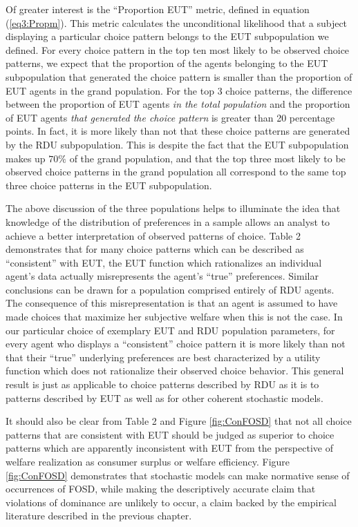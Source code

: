 \documentclass[../main.tex]{subfiles}
\begin{document}
Of greater interest is the \enquote{Proportion EUT} metric, defined in equation (\ref{eq3:Propm}).
This metric calculates the unconditional likelihood that a subject displaying a particular choice pattern belongs to the EUT subpopulation we defined.
For every choice pattern in the top ten most likely to be observed choice patterns, we expect that the proportion of the agents belonging to the EUT subpopulation that generated the choice pattern is smaller than the proportion of EUT agents in the grand population.
For the top 3 choice patterns, the difference between the proportion of EUT agents \textit{in the total population} and the proportion of EUT agents \textit{that generated the choice pattern} is greater than 20 percentage points.
In fact, it is more likely than not that these choice patterns are generated by the RDU subpopulation.
This is despite the fact that the EUT subpopulation makes up $70\%$ of the grand population, and that the top three most likely to be observed choice patterns in the grand population all correspond to the same top three choice patterns in the EUT subpopulation.


The above discussion of the three populations helps to illuminate the idea that knowledge of the distribution of preferences in a sample allows an analyst to achieve a better interpretation of observed patterns of choice.
Table 2 demonstrates that for many choice patterns which can be described as \enquote{consistent} with EUT, the EUT function which rationalizes an individual agent's data actually misrepresents the agent's \enquote{true} preferences.
Similar conclusions can be drawn for a population comprised entirely of RDU agents.
The consequence of this misrepresentation is that an agent is assumed to have made choices that maximize her subjective welfare when this is not the case.
In our particular choice of exemplary EUT and RDU population parameters, for every agent who displays a \enquote{consistent} choice pattern it is more likely than not that their \enquote{true} underlying preferences are best characterized by a utility function which does not rationalize their observed choice behavior.
This general result is just as applicable to choice patterns described by RDU as it is to patterns described by EUT as well as for other coherent stochastic models.

It should also be clear from Table 2 and Figure \ref{fig:ConFOSD} that not all choice patterns that are consistent with EUT should be judged as superior to choice patterns which are apparently inconsistent with EUT from the perspective of welfare realization as consumer surplus or welfare efficiency.
Figure \ref{fig:ConFOSD} demonstrates that stochastic models can make normative sense of occurrences of FOSD, while making the descriptively accurate claim that violations of dominance are unlikely to occur, a claim backed by the empirical literature described in the previous chapter.
\end{document}
